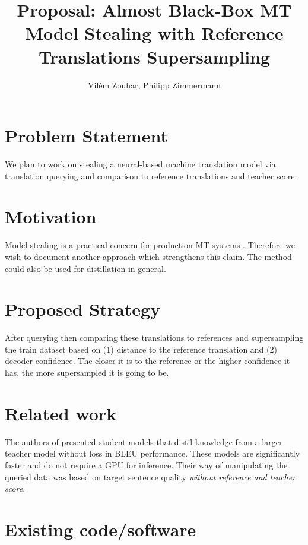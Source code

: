 \documentclass[final]{cvpr}
\author{Vilém Zouhar, Philipp Zimmermann}
\begin{document}
\title{Proposal: Almost Black-Box MT Model Stealing with Reference Translations Supersampling}

\maketitle
\thispagestyle{empty}


\section{Problem Statement}

We plan to work on stealing a neural-based machine translation model via translation querying and comparison to reference translations and teacher score.

\section{Motivation}

Model stealing is a practical concern for production MT systems \cite{wallace2020imitation}. Therefore we wish to document another approach which strengthens this claim. The method could also be used for distillation in general.

\section{Proposed Strategy}

After querying then comparing these translations to references and supersampling the train dataset based on (1) distance to the reference translation and (2) decoder confidence. The closer it is to the reference or the higher confidence it has, the more supersampled it is going to be.

\section{Related work}

The authors of \cite{SpeedOptMS} presented student models that distil knowledge from a larger teacher model without loss in BLEU performance. These models are significantly faster and do not require a GPU for inference. Their way of manipulating the queried data was based on target sentence quality \textit{without reference and teacher score}.

\section{Existing code/software}
\end{document}
